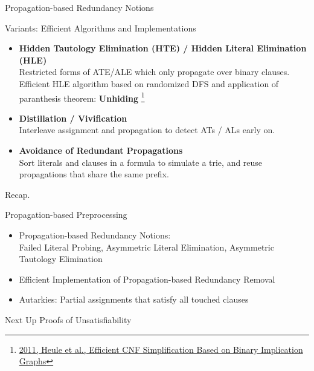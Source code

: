 \documentclass[t]{sdqbeamer}
\begin{document}
\begin{frame}{Propagation-based Redundancy Notions}
\begin{block}{Variants: Efficient Algorithms and Implementations}~\\
\begin{itemize}\setlength{\itemsep}{1em}
    \item \textbf{Hidden Tautology Elimination (HTE) / Hidden Literal Elimination (HLE)}\\[3pt]
    Restricted forms of ATE/ALE which only propagate over binary clauses.\\[3pt]
    Efficient HLE algorithm based on randomized DFS and application of paranthesis theorem: \textbf{Unhiding}%
    \footnote{\href{https://link.springer.com/chapter/10.1007/978-3-642-21581-0_17}{2011, Heule et al., Efficient CNF Simplification Based on Binary Implication Graphs}}
    \item \textbf{Distillation / Vivification}\\[3pt]
    Interleave assignment and propagation to detect ATs / ALs early on.
    \item \textbf{Avoidance of Redundant Propagations}\\[3pt]
    Sort literals and clauses in a formula to simulate a trie, and reuse propagations that share the same prefix.
\end{itemize}
\end{block}
\end{frame}


\begin{frame}{Recap.}
\begin{block}{Propagation-based Preprocessing}
    \begin{itemize}\setlength{\itemsep}{1em}
        \item Propagation-based Redundancy Notions:\\[1ex]
        Failed Literal Probing, Asymmetric Literal Elimination, Asymmetric Tautology Elimination
        \item Efficient Implementation of Propagation-based Redundancy Removal
        \item Autarkies: Partial assignments that satisfy all touched clauses
    \end{itemize}
\end{block}
\begin{block}{Next Up}
    Proofs of Unsatisfiability
\end{block}
\end{frame}
\end{document}
